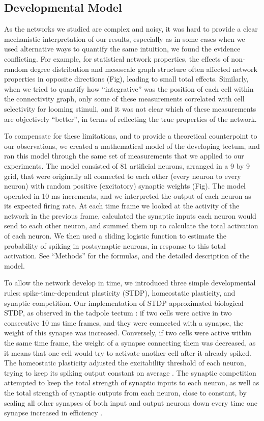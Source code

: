 \documentclass{article}
\begin{document}
\subsection*{Developmental Model}

As the networks we studied are complex and noisy, it was hard to provide a clear mechanistic interpretation of our results, especially as in some cases when we used alternative ways to quantify the same intuition, we found the evidence conflicting. For example, for statistical network properties, the effects of non-random degree distribution and mesoscale graph structure often affected network properties in opposite directions (Fig), leading to small total effects. Similarly, when we tried to quantify how “integrative” was the position of each cell within the connectivity graph, only some of these measurements correlated with cell selectivity for looming stimuli, and it was not clear which of these measurements are objectively “better”, in terms of reflecting the true properties of the network.

To compensate for these limitations, and to provide a theoretical counterpoint to our observations, we created a mathematical model of the developing tectum, and ran this model through the same set of measurements that we applied to our experiments. The model consisted of 81 artificial neurons, arranged in a 9 by 9 grid, that were originally all connected to each other (every neuron to every neuron) with random positive (excitatory) synaptic weights (Fig). The model operated in 10 ms increments, and we interpreted the output of each neuron as its expected firing rate. At each time frame we looked at the activity of the network in the previous frame, calculated the synaptic inputs each neuron would send to each other neuron, and summed them up to calculate the total activation of each neuron. We then used a sliding logistic function to estimate the probability of spiking in postsynaptic neurons, in response to this total activation. See “Methods” for the formulas, and the detailed description of the model.

To allow the network develop in time, we introduced three simple developmental rules: spike-time-dependent plasticity (STDP), homeostatic plasticity, and synaptic competition. Our implementation of STDP approximated biological STDP, as observed in the tadpole tectum \citep{zhang1998stdp,mu2006stdp}: if two cells were active in two consecutive 10 ms time frames, and they were connected with a synapse, the weight of this synapse was increased. Conversely, if two cells were active within the same time frame, the weight of a synapse connecting them was decreased, as it means that one cell would try to activate another cell after it already spiked. The homeostatic plasticity adjusted the excitability threshold of each neuron, trying to keep its spiking output constant on average \citep{pratt2007intrinsic,turrigiano2011}. The synaptic competition attempted to keep the total strength of synaptic inputs to each neuron, as well as the total strength of synaptic outputs from each neuron, close to constant, by scaling all other synapses of both input and output neurons down every time one synapse increased in efficiency \citep{hamodi2016nmda,cohen2002synreview,munz2014hebbian}.
\end{document}

